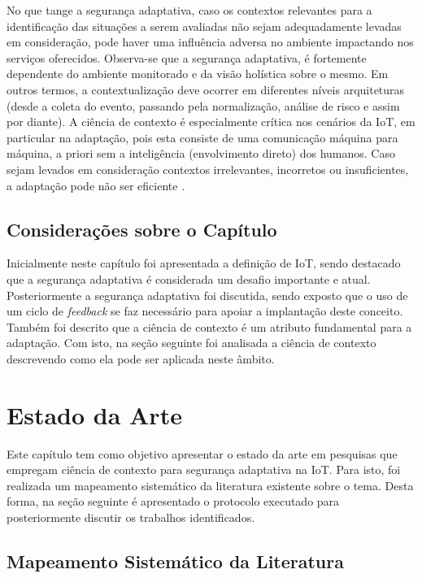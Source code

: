 \documentclass[tid,table]{texufpel} %
\begin{document}
No que tange a segurança adaptativa, caso os contextos relevantes para a identificação das situações a serem avaliadas não sejam adequadamente levadas em consideração, pode haver uma influência adversa no ambiente impactando nos serviços oferecidos. Observa-se que a segurança adaptativa, é fortemente dependente do ambiente monitorado e da visão holística sobre o mesmo. Em outros termos, a contextualização deve ocorrer em diferentes níveis arquiteturas (desde a coleta do evento, passando pela normalização, análise de risco e assim por diante). A ciência de contexto é especialmente crítica nos cenários da IoT, em particular na adaptação, pois esta consiste de uma comunicação máquina para máquina, a priori sem a inteligência (envolvimento direto) dos humanos. Caso sejam levados em consideração contextos irrelevantes, incorretos ou insuficientes, a adaptação pode não ser eficiente \cite{aman15}.



\section{Considerações sobre o Capítulo}

Inicialmente neste capítulo foi apresentada a definição de IoT, sendo destacado que a segurança adaptativa é considerada um desafio importante e atual. Posteriormente a segurança adaptativa foi discutida, sendo exposto que o uso de um ciclo de \textit{feedback} se faz necessário para apoiar a implantação deste conceito. Também foi descrito que a ciência de contexto é um atributo fundamental para a adaptação. Com isto, na seção seguinte foi analisada a ciência de contexto descrevendo como ela pode ser aplicada neste âmbito.


\chapter{Estado da Arte} 

Este capítulo tem como objetivo apresentar o estado da arte em pesquisas que empregam ciência de contexto para segurança adaptativa na IoT. Para isto, foi realizada um mapeamento sistemático da literatura existente sobre o tema. Desta forma, na seção seguinte é apresentado o protocolo executado para posteriormente discutir os trabalhos identificados.


\section{Mapeamento Sistemático da Literatura}
\end{document}
